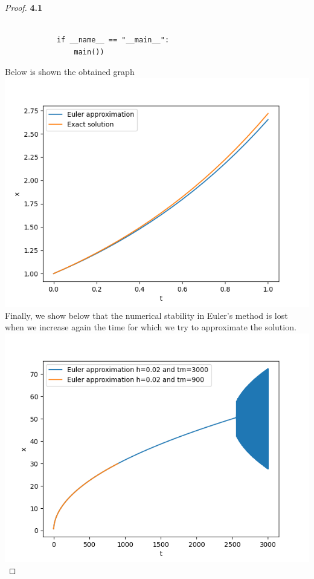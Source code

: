 \documentclass[11pt]{article}
\begin{document}
\begin{proof}{\textbf{4.1}}
\begin{verbatim}
            
            if __name__ == "__main__":
                main())
        \end{verbatim}
        Below is shown the obtained graph\\
        \includegraphics{linear_euler.png}
\cleardoublepage
        Finally, we show below that the numerical stability in Euler's method is
        lost when we increase again the time for which we try to approximate
        the solution.\\
        \includegraphics{nonlinear_euler.png}
	\end{proof}
\cleardoublepage
\end{document}
